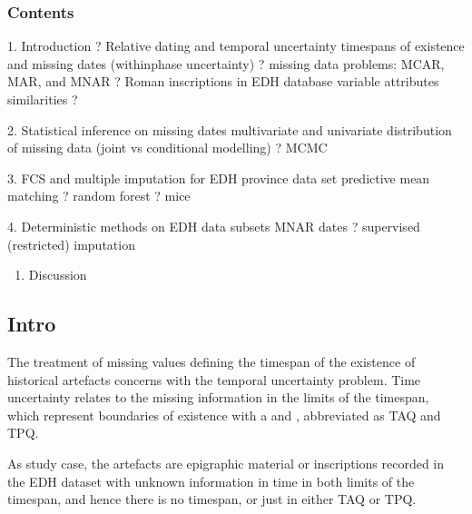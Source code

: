 \documentclass[a4paper,12pt,english]{sphinxhowto}
\begin{document}
\subsubsection{Contents}
\label{\detokenize{Imputation:contents}}
1. Introduction
? Relative dating and temporal uncertainty
time\sphinxhyphen{}spans of existence and missing dates (within\sphinxhyphen{}phase uncertainty) ? missing data problems: MCAR, MAR, and MNAR
? Roman inscriptions in EDH database
variable attributes similarities ?

2. Statistical inference on missing dates
multivariate and univariate distribution of missing data (joint vs conditional modelling) ?  MCMC

3. FCS and multiple imputation for EDH province data set
predictive mean matching ? random forest ? mice

4. Deterministic methods on EDH data subsets
MNAR dates ? supervised (restricted) imputation
\begin{enumerate}
%
\setcounter{enumi}{4}
\item {} 
Discussion

\end{enumerate}



\subsection{Intro}
\label{\detokenize{Imputation:intro}}
The treatment of missing values defining the timespan of the existence of historical artefacts concerns with the temporal uncertainty problem.
Time uncertainty relates to the missing information in the limits of the timespan, which represent boundaries of existence with a  and , abbreviated as TAQ and TPQ.

As study case, the artefacts are epigraphic material or inscriptions recorded in the EDH dataset with unknown information in time in both limits of the timespan, and hence there is no timespan, or just in either TAQ or TPQ.

\end{document}
